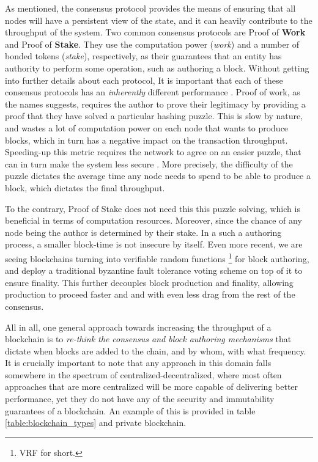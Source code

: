 As mentioned, the consensus protocol provides the means of ensuring that all nodes will have a persistent
view of the state, and it can heavily contribute to the throughput of the system. Two common
consensus protocols are Proof of \textbf{Work} and Proof of \textbf{Stake}. They use the computation
power (\textit{work}) and a number of bonded tokens (\textit{stake}), respectively, as their guarantees
that an entity has authority to perform some operation, such as authoring a block. Without getting
into further details about each protocol, It is important that each of these
consensus protocols has an \textit{inherently} different performance \cite{survey_on_all}. Proof of work, as
the names suggests, requires the author to prove their legitimacy by providing a proof that they
have solved a particular hashing puzzle. This is slow by nature, and wastes a lot of computation
power on each node that wants to produce blocks, which in turn has a negative impact on the
transaction throughput. Speeding-up this metric requires the network to agree on an easier
puzzle, that can in turn make the system less secure \cite{security_of_bitcoin}. More precisely, the
difficulty of the puzzle dictates the average time any node needs to spend to be able to produce a
block, which dictates the final throughput.

To the contrary, Proof of Stake does not need this this puzzle solving, which is
beneficial in terms of computation resources. Moreover, since the chance of any node being the
author is determined by their stake. In a such a authoring process, a smaller block-time is not insecure by itself. Even more
recent, we are seeing blockchains turning into verifiable random
functions \cite{Dodis_Yampolskiy_2005_VRF}\footnote{VRF for short.} for block authoring, and deploy a
traditional byzantine fault tolerance voting scheme on top of it to ensure finality. This further
decouples block production and finality, allowing production to proceed faster and and with even
less drag from the rest of the consensus.

All in all, one general approach towards increasing the throughput of a blockchain is to
\textit{re-think the consensus and block authoring mechanisms} that dictate when blocks are added to
the chain, and by whom, with what frequency. It is crucially important to note that any approach in
this domain falls somewhere in the spectrum of centralized-decentralized, where most often
approaches that are more centralized will be more capable of delivering better performance, yet they
do not have any of the security and immutability guarantees of a blockchain. An example of this is
provided in table \ref{table:blockchain_types} and private blockchain.

